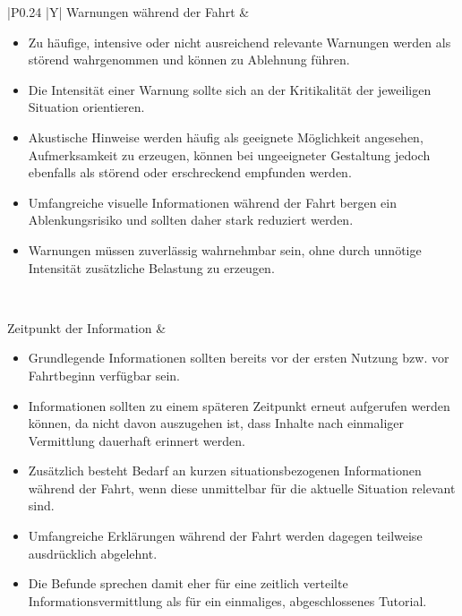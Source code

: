 {\begin{xltabular}{\textwidth}{
    |P{0.24\textwidth}
    |Y|
}
Warnungen während der Fahrt &
\begin{itemize}[leftmargin=*,nosep]
    \item Zu häufige, intensive oder nicht ausreichend relevante Warnungen werden als störend wahrgenommen und können zu Ablehnung führen.
    \item Die Intensität einer Warnung sollte sich an der Kritikalität der jeweiligen Situation orientieren.
    \item Akustische Hinweise werden häufig als geeignete Möglichkeit angesehen, Aufmerksamkeit zu erzeugen, können bei ungeeigneter Gestaltung jedoch ebenfalls als störend oder erschreckend empfunden werden.
    \item Umfangreiche visuelle Informationen während der Fahrt bergen ein Ablenkungsrisiko und sollten daher stark reduziert werden.
    \item Warnungen müssen zuverlässig wahrnehmbar sein, ohne durch unnötige Intensität zusätzliche Belastung zu erzeugen.
\end{itemize}
\\
\hline

Zeitpunkt der Information &
\begin{itemize}[leftmargin=*,nosep]
    \item Grundlegende Informationen sollten bereits vor der ersten Nutzung bzw. vor Fahrtbeginn verfügbar sein.
    \item Informationen sollten zu einem späteren Zeitpunkt erneut aufgerufen werden können, da nicht davon auszugehen ist, dass Inhalte nach einmaliger Vermittlung dauerhaft erinnert werden.
    \item Zusätzlich besteht Bedarf an kurzen situationsbezogenen Informationen während der Fahrt, wenn diese unmittelbar für die aktuelle Situation relevant sind.
    \item Umfangreiche Erklärungen während der Fahrt werden dagegen teilweise ausdrücklich abgelehnt.
    \item Die Befunde sprechen damit eher für eine zeitlich verteilte Informationsvermittlung als für ein einmaliges, abgeschlossenes Tutorial.
\end{itemize}
\\
\hline


\end{xltabular}}
